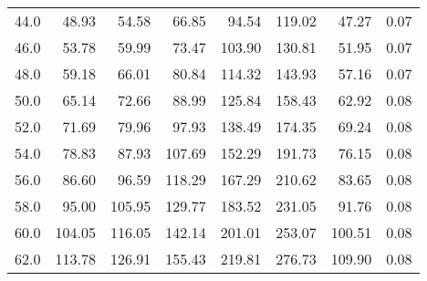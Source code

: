 \begin{tabular}{lrrrrrrr}
44.0 &                            48.93 &                            54.58 &                            66.85 &                            94.54 &                             119.02 &                            47.27 &        0.07 \\
46.0 &                            53.78 &                            59.99 &                            73.47 &                           103.90 &                             130.81 &                            51.95 &        0.07 \\
48.0 &                            59.18 &                            66.01 &                            80.84 &                           114.32 &                             143.93 &                            57.16 &        0.07 \\
50.0 &                            65.14 &                            72.66 &                            88.99 &                           125.84 &                             158.43 &                            62.92 &        0.08 \\
52.0 &                            71.69 &                            79.96 &                            97.93 &                           138.49 &                             174.35 &                            69.24 &        0.08 \\
54.0 &                            78.83 &                            87.93 &                           107.69 &                           152.29 &                             191.73 &                            76.15 &        0.08 \\
56.0 &                            86.60 &                            96.59 &                           118.29 &                           167.29 &                             210.62 &                            83.65 &        0.08 \\
58.0 &                            95.00 &                           105.95 &                           129.77 &                           183.52 &                             231.05 &                            91.76 &        0.08 \\
60.0 &                           104.05 &                           116.05 &                           142.14 &                           201.01 &                             253.07 &                           100.51 &        0.08 \\
62.0 &                           113.78 &                           126.91 &                           155.43 &                           219.81 &                             276.73 &                           109.90 &        0.08 \\

\end{tabular}
